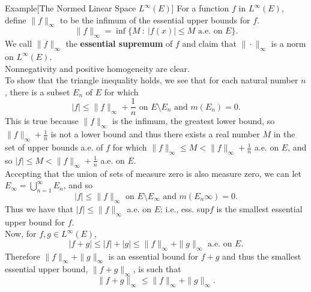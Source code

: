\begin{flushleft}
	\begin{namedthm*}{Example}[The Normed Linear Space $L^\infty(E)$]
		For a function $f$ in $L^\infty(E)$, define $\|f\|_\infty$ to be the infimum of the essential upper bounds for $f$.
		\[
			\|f\|_\infty = \inf\{M\ :\ |f(x)|\le M\text{ a.e. on }E\}.
		\]
		We call $\|f\|_\infty$ the \textbf{essential supremum} of $f$ and claim that $\|\cdot\|_\infty$ is a norm on $L^\infty(E)$.
		\\Nonnegativity and positive homogeneity are clear. 
		\\To show that the triangle inequality holds, we see that for each natural number $n$, there is a subset $E_n$ of $E$ for which
		\[
		|f|\le \|f\|_\infty + \frac{1}{n}\text{ on }E\setminus E_n\text{ and }m(E_n)=0.	
		\]
		This is true because $\|f\|_\infty$ is the infimum, the greatest lower bound, so $\|f\|_\infty + \frac{1}{n}$ is not a lower bound and thus there exists a real number $M$ in the set of upper bounds a.e. of $f$ for which $\|f\|_\infty\le M < \|f\|_\infty + \frac{1}{n}$ a.e. on $E$, and so $|f|\le M < \|f\|_\infty + \frac{1}{n}$ a.e. on $E$.
		\\Accepting that the union of sets of measure zero is also measure zero, we can let $E_\infty = \bigcup_{n=1}^\infty E_n$, and so 
		\[
		|f|\le \|f\|_\infty \text{ on }E\setminus E_\infty\text{ and }m(E_n\infty)=0.	
		\]
		Thus we have that $|f|\le \|f\|_\infty$ a.e. on $E$; i.e., ess. sup$f$ is the smallest essential upper bound for $f$.
		\\Now, for $f,g\in L^\infty(E)$, 
		\[
			|f+g|\le|f|+|g|\le\|f\|_\infty+\|g\|_\infty\text{ a.e. on }E.
		\]
		Therefore $\|f\|_\infty+\|g\|_\infty$ is an essential bound for $f+g$ and thus the smallest essential upper bound, $\|f+g\|_\infty$, is such that
		\[
		\|f+g\|_\infty \le \|f\|_\infty+\|g\|_\infty.	
		\]
	\end{namedthm*}


\end{flushleft}
